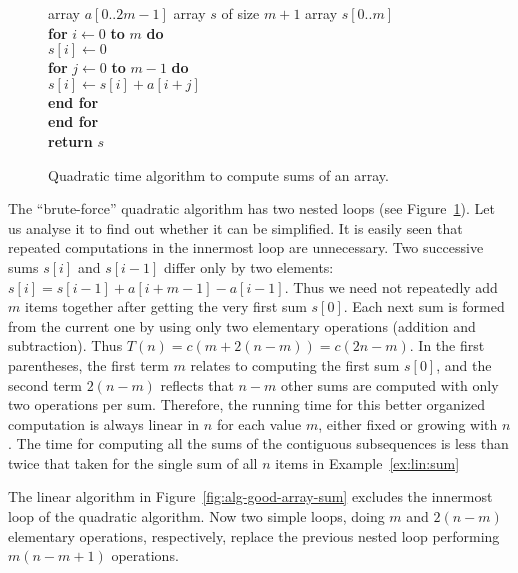 \begin{Example} 
\begin{figure}[htbp]
\begin{center}
\begin{minipage}{5in}
{array $a[0..2m-1]$}
{array $s$ of size \(m+1\)}
{
\> array $s[0..m]$\\
\> \textbf{for} \(i \leftarrow  0\) \textbf{to} $m$ \textbf{do}\\
\> \>\(s[i] \leftarrow 0\)\\
\> \>\textbf{for} \(j \leftarrow  0\) \textbf{to} \(m-1\) \textbf{do}\\
\> \>\>\(s[i] \leftarrow s[i] + a[i+j] \) \\
\> \>\textbf{end for} \\
\> \textbf{end for} \\
\> \textbf{return} $s$ \\
}
\end{minipage}
\end{center}
\caption{Quadratic time algorithm to compute sums of an array.}
\label{fig:alg-bad-array-sum}
\end{figure}

The ``brute-force'' quadratic algorithm has two nested loops (see
Figure~\ref{fig:alg-bad-array-sum}).
Let us analyse it to find out whether it can be simplified. It is easily
seen that repeated computations in the innermost loop are unnecessary.
Two successive sums $s[i]$ and $s[i-1]$ differ only by
two elements: \(s[i]=s[i-1]+ a[i+m-1]-a[i-1]\). Thus we need not
repeatedly add $m$ items together after getting the very first sum
$s[0]$. Each next sum is formed from the current one by using only two
elementary operations (addition and subtraction). Thus $T(n) = c  (m + 2
 (n-m)) = c  (2n - m)$. In the first parentheses, the first term $m$
relates to computing the first sum $s[0]$, and the second term $2 
(n-m)$ reflects that $n-m$ other sums are computed with only two
operations per sum. Therefore, the running time for this better
organized computation is always linear in $n$ for each value $m$, either
fixed or growing with $n$. The time for computing all the sums of the
contiguous subsequences is less than twice that taken for the single sum of all 
$n$ items in Example~\ref{ex:lin:sum}
 
The linear algorithm in Figure~\ref{fig:alg-good-array-sum}
excludes the innermost loop of the quadratic
algorithm. Now two simple loops, doing $m$ and $2(n-m)$ elementary
operations, respectively, replace the previous nested loop performing $m
 (n-m+1)$ operations. 
\end{Example} 

